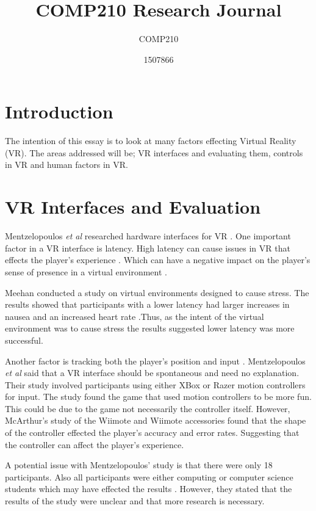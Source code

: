 \documentclass{scrartcl}
\title{COMP210 Research Journal}
\subtitle{COMP210}
\author{1507866}
\begin{document}
	
\maketitle
	

\section{Introduction}
The intention of this essay is to look at many factors effecting Virtual Reality (VR). The areas addressed will be; VR interfaces and evaluating them, controls in VR and  human factors in VR. 
	
\section{VR Interfaces and Evaluation}
Mentzelopoulos \textit{et al} researched hardware interfaces for VR \cite{Mentzelopoulos}.  
One important factor in a VR interface is latency. High latency can cause issues in VR that effects the player's experience \cite{Mentzelopoulos, Meehan}. Which can have a negative impact on the player's sense of presence in a virtual environment \cite{Meehan}. 
 
\bigskip 
 
Meehan conducted a study on virtual environments designed to cause stress. The results showed that participants with a lower latency had larger increases in nausea and an increased heart rate \cite{Meehan}.Thus,  as the intent of the virtual environment was to cause stress the results suggested lower latency was more successful.

\bigskip

Another factor is tracking both the player's position and input \cite{Mentzelopoulos}. Mentzelopoulos \textit{et al} said that a VR interface should be spontaneous and need no explanation. Their study involved participants using either XBox or Razer motion controllers for input. The study found the game that used motion controllers to be more fun. This could be due to the game not necessarily the controller itself.  However, McArthur's study of the Wiimote and  Wiimote accessories found that the shape of the controller effected the player's accuracy and error rates.  Suggesting that the controller can affect the player's experience.

\bigskip  

A potential issue with Mentzelopoulos' study is that there were only 18 participants. Also all participants were either computing or computer science students which may have effected the results \cite{Mentzelopoulos}. However, they stated that the results of the study were unclear and that more research is necessary.
\end{document}
